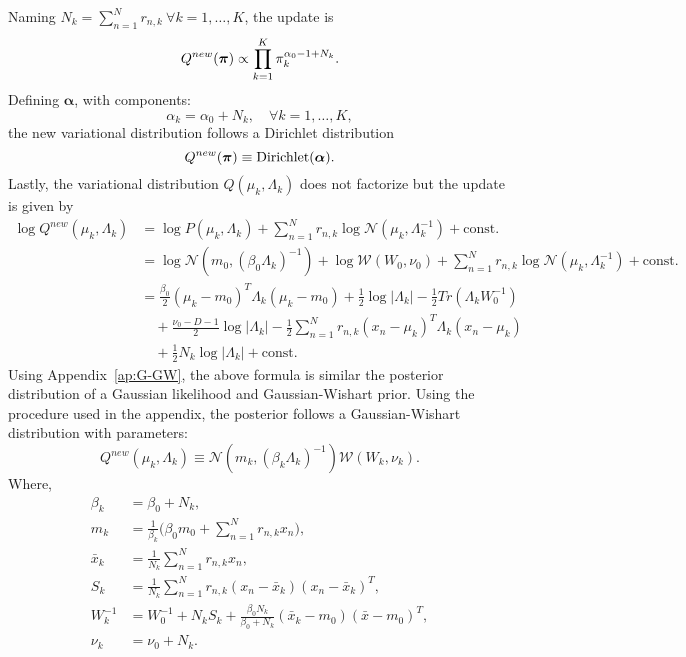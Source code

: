 Naming \(N_{k} = \sum_{n=1}^{N}r_{n,k} \ \forall k=1,\dots,K\), the update is
\[
  Q^{new}(\bm{\pi}) \propto \prod_{k=1}^{K}\pi_{k}^{\alpha_{0}-1+N_{k}}.
\]
Defining \(\bm{\alpha}\), with components:
\[
  \alpha_{k} = \alpha_{0} + N_{k}, \quad \forall k = 1,\dots,K,
\]
the new variational distribution follows a Dirichlet distribution
\[
  Q^{new}(\bm{\pi}) \equiv \text{Dirichlet}(\bm{\alpha}).
\]
Lastly, the variational distribution \(Q(\mu_{k}, \Lambda_{k})\) does not factorize but the update is given by
\[
  \begin{aligned}
    \log Q^{new}(\mu_{k}, \Lambda_{k}) &= \log P(\mu_{k}, \Lambda_{k}) + \sum_{n=1}^{N}r_{n,k} \log \mathcal{N}(\mu_{k}, \Lambda_{k}^{-1}) + \text{const.}\\
    &= \log \mathcal{N}(m_{0}, {(\beta_{0}\Lambda_{k})}^{-1}) + \log \mathcal{W}(W_{0}, \nu_{0}) + \sum_{n=1}^{N}r_{n,k} \log \mathcal{N}(\mu_{k}, \Lambda_{k}^{-1}) + \text{const.}\\
    &= \frac{\beta_{0}}{2}{(\mu_{k} - m_{0})}^{T}\Lambda_{k}(\mu_{k} - m_{0}) + \frac{1}{2}\log |\Lambda_{k}| - \frac{1}{2}Tr(\Lambda_{k}W_{0}^{-1})\\
    &\quad + \frac{\nu_{0} - D - 1}{2}\log |\Lambda_{k}| - \frac{1}{2}\sum_{n=1}^{N}r_{n,k}{(x_{n}- \mu_{k})}^{T}\Lambda_{k}(x_{n} - \mu_{k})\\
    &\quad + \frac{1}{2}N_{k} \log |\Lambda_{k}| + \text{const.}
    \end{aligned}
  \]
  Using Appendix~\ref{ap:G-GW}, the above formula is similar the posterior distribution of a Gaussian likelihood and Gaussian-Wishart prior. Using the procedure used in the appendix, the posterior follows a Gaussian-Wishart distribution with parameters:
  \[
    Q^{new}(\mu_{k}, \Lambda_{k}) \equiv  \mathcal{N}( m_{k}, (\beta_{k}\Lambda_{k})^{-1}) \mathcal{W}(W_{k}, \nu_{k}).
  \]
  Where,
  \[
    \begin{aligned}
      \beta_{k} &= \beta_{0} + N_{k},\\
      m_{k} &= \frac{1}{\beta_{k}}\Big(\beta_{0}m_{0} + \sum_{n=1}^{N}r_{n,k}x_{n}\Big),\\
      \bar{x}_{k} &= \frac{1}{N_{k}}\sum_{n=1}^{N}r_{n,k}x_{n},\\
      S_{k} &= \frac{1}{N_{k}}\sum_{n=1}^{N}r_{n,k}(x_{n}- \bar{x}_{k})(x_{n} - \bar{x}_{k})^{T},\\
      W_{k}^{-1} &= W_{0}^{-1} + N_{k}S_{k} + \frac{\beta_{0}N_{k}}{\beta_{0} + N_{k}}(\bar{x}_{k} - m_{0})(\bar{x}-m_{0})^{T},\\
      \nu_{k} &= \nu_{0} + N_{k}.
    \end{aligned}
  \]
